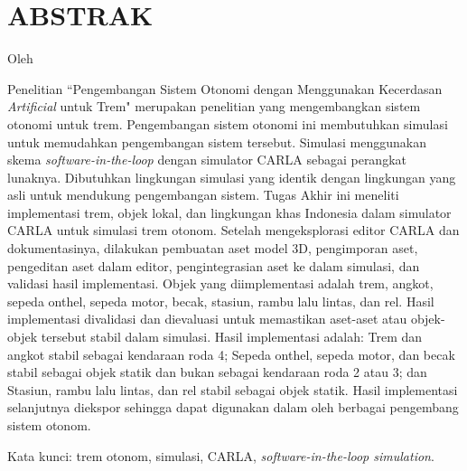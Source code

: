 \chapter*{ABSTRAK}

\begin{center}
	\center
	\begin{doublespace}
		\Large \bfseries \MakeUppercase{\thetitle}

		\normalfont \normalsize
		Oleh

		\theauthor
	\end{doublespace}
\end{center}

\begin{singlespace}
	Penelitian ``Pengembangan Sistem Otonomi dengan Menggunakan Kecerdasan
	\textit{Artificial} untuk Trem"  merupakan penelitian yang mengembangkan
	sistem otonomi untuk trem. Pengembangan sistem otonomi ini membutuhkan
	simulasi untuk memudahkan pengembangan sistem tersebut. Simulasi
	menggunakan skema \textit{software-in-the-loop} dengan simulator CARLA
	sebagai perangkat lunaknya. Dibutuhkan lingkungan simulasi yang identik
	dengan lingkungan yang asli untuk mendukung pengembangan sistem. Tugas Akhir
	ini meneliti implementasi trem, objek lokal, dan lingkungan khas Indonesia
	dalam simulator CARLA untuk simulasi trem otonom. Setelah mengeksplorasi
	editor CARLA dan dokumentasinya, dilakukan pembuatan aset model 3D,
	pengimporan aset, pengeditan aset dalam editor, pengintegrasian aset ke
	dalam simulasi, dan validasi hasil implementasi. Objek yang diimplementasi
	adalah trem, angkot, sepeda onthel, sepeda motor, becak, stasiun, rambu lalu
	lintas, dan rel. Hasil implementasi divalidasi dan dievaluasi untuk
	memastikan aset-aset atau objek-objek tersebut stabil dalam simulasi. Hasil
	implementasi adalah: Trem dan angkot stabil sebagai kendaraan roda 4; Sepeda
	onthel, sepeda motor, dan becak stabil sebagai objek statik dan bukan
	sebagai kendaraan roda 2 atau 3; dan Stasiun, rambu lalu lintas, dan rel
	stabil sebagai objek statik. Hasil implementasi selanjutnya diekspor
	sehingga dapat digunakan dalam oleh berbagai pengembang sistem otonom.

	Kata kunci: trem otonom, simulasi, CARLA, \textit{software-in-the-loop
	simulation}.
\end{singlespace}

\clearpage
